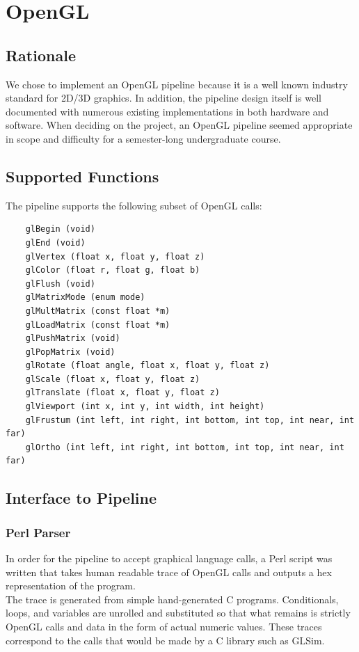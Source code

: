 \documentclass[letterpaper,10pt]{article}
\begin{document}
\section{OpenGL}
\subsection{Rationale}
We chose to implement an OpenGL pipeline because it is a well known industry standard for 2D/3D graphics. In addition, the pipeline design itself is well documented with numerous existing implementations in both hardware and software. When deciding on the project, an OpenGL pipeline seemed appropriate in scope and difficulty for a semester-long undergraduate course.

\subsection{Supported Functions}

The pipeline supports the following subset of OpenGL calls:
\begin{verbatim}
	glBegin (void)
	glEnd (void)
	glVertex (float x, float y, float z)
	glColor (float r, float g, float b)
	glFlush (void)
	glMatrixMode (enum mode)
	glMultMatrix (const float *m)
	glLoadMatrix (const float *m)
	glPushMatrix (void)
	glPopMatrix (void)
	glRotate (float angle, float x, float y, float z)
	glScale (float x, float y, float z)
	glTranslate (float x, float y, float z)
	glViewport (int x, int y, int width, int height)
	glFrustum (int left, int right, int bottom, int top, int near, int far)
	glOrtho (int left, int right, int bottom, int top, int near, int far)
\end{verbatim}

\subsection{Interface to Pipeline}

\subsubsection{Perl Parser}
In order for the pipeline to accept graphical language calls, a Perl script was written that takes human readable trace of OpenGL calls and outputs a hex representation of the program. \\

The trace is generated from simple hand-generated C programs. Conditionals, loops, and variables are unrolled and substituted so that what remains is strictly OpenGL calls and data in the form of actual numeric values. These traces correspond to the calls that would be made by a C library such as GLSim.\\
\end{document}
